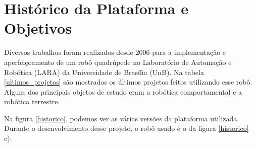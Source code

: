 \documentclass[12pt]{report}
\begin{document}
\section*{Histórico da Plataforma e Objetivos}

Diversos trabalhos foram realizados desde 2006 para a implementação e aperfeiçoamento de um robô quadrúpede no Laboratório de Automação e Robótica (LARA) da Universidade de Brasília (UnB). Na tabela \ref{ultimos_projetos} são mostrados os últimos projetos feitos utilizando esse robô. Alguns dos principais objetos de estudo eram a robótica comportamental e a robótica terrestre.

\begin{table}[ht!]
\centering
{}
\caption{Os mais recentes projetos desenvolvidos utilizando a plataforma quadrúpede do LARA.}
\label{ultimos_projetos}
\end{table}

Na figura \ref{historico}, podemos ver as várias versões da plataforma utilizada. Durante o desenvolvimento desse projeto, o robô usado é o da figura \ref{historico} c).
\end{document}
